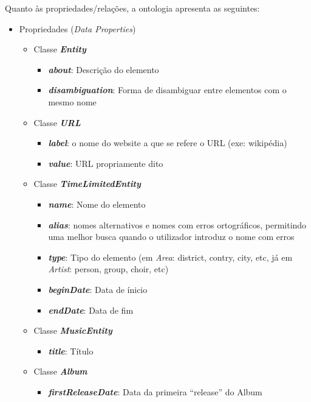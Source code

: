 \documentclass{article}
\begin{document}
Quanto às propriedades/relações, a ontologia apresenta as seguintes:
\begin{itemize}
    \item Propriedades (\textit{Data Properties})
    \begin{itemize}
        \item Classe \textbf{\textit{Entity}}
        \begin{itemize}
            \item \textbf{\textit{about}}: Descrição do elemento
            \item \textbf{\textit{disambiguation}}: Forma de disambiguar entre elementos com o mesmo nome
        \end{itemize}
        \item Classe \textbf{\textit{URL}}
        \begin{itemize}
            \item \textbf{\textit{label}}: o nome do website a que se refere o URL (exe: wikipédia)
            \item \textbf{\textit{value}}: URL propriamente dito
        \end{itemize}
        \item Classe \textbf{\textit{TimeLimitedEntity}}
        \begin{itemize}
            \item \textbf{\textit{name}}: Nome do elemento
            \item \textbf{\textit{alias}}: nomes alternativos e nomes com erros ortográficos, permitindo uma melhor busca quando o utilizador introduz o nome com erros 
            \item \textbf{\textit{type}}: Tipo do elemento (em \textit{Area}: district, contry, city, etc, já em \textit{Artist}: person, group, choir, etc)
            \item \textbf{\textit{beginDate}}: Data de ínicio
            \item \textbf{\textit{endDate}}: Data de fim
        \end{itemize}
        \item Classe \textbf{\textit{MusicEntity}}
        \begin{itemize}
            \item \textbf{\textit{title}}: Título
        \end{itemize}
        \item Classe \textbf{\textit{Album}}
        \begin{itemize}
            \item \textbf{\textit{firstReleaseDate}}: Data da primeira ``release'' do Album

\end{itemize}
\end{itemize}
\end{itemize}
\end{document}
